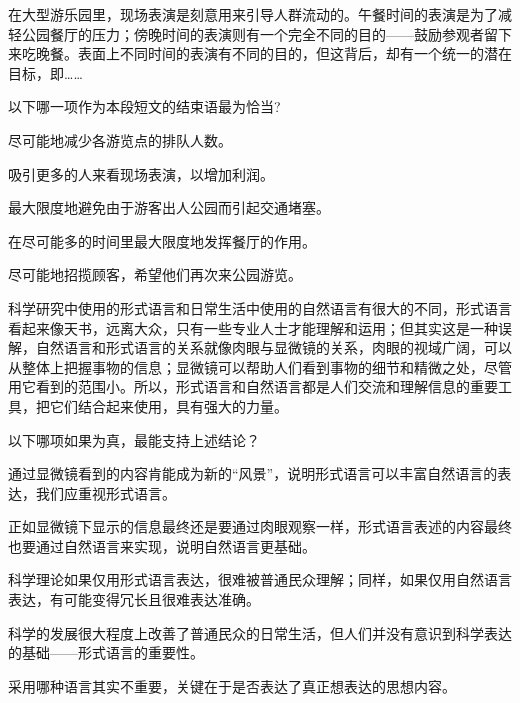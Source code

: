 \documentclass{exam-zh}
\begin{document}
\begin{question}
在大型游乐园里，现场表演是刻意用来引导人群流动的。午餐时间的表演是为了减轻公园餐厅的压力；傍晚时间的表演则有一个完全不同的目的——鼓励参观者留下来吃晚餐。表面上不同时间的表演有不同的目的，但这背后，却有一个统一的潜在目标，即……

以下哪一项作为本段短文的结束语最为恰当?  \paren[]
\begin{choices}
  \item 尽可能地减少各游览点的排队人数。
  \item 吸引更多的人来看现场表演，以增加利润。
  \item 最大限度地避免由于游客出人公园而引起交通堵塞。
  \item 在尽可能多的时间里最大限度地发挥餐厅的作用。
  \item 尽可能地招揽顾客，希望他们再次来公园游览。
\end{choices}
\end{question}

\begin{question}
科学研究中使用的形式语言和日常生活中使用的自然语言有很大的不同，形式语言看起来像天书，远离大众，只有一些专业人士才能理解和运用；但其实这是一种误解，自然语言和形式语言的关系就像肉眼与显微镜的关系，肉眼的视域广阔，可以从整体上把握事物的信息；显微镜可以帮助人们看到事物的细节和精微之处，尽管用它看到的范围小。所以，形式语言和自然语言都是人们交流和理解信息的重要工具，把它们结合起来使用，具有强大的力量。

以下哪项如果为真，最能支持上述结论？ \paren[]
\begin{choices}
  \item 通过显微镜看到的内容肯能成为新的“风景”，说明形式语言可以丰富自然语言的表达，我们应重视形式语言。
  \item 正如显微镜下显示的信息最终还是要通过肉眼观察一样，形式语言表述的内容最终也要通过自然语言来实现，说明自然语言更基础。
  \item 科学理论如果仅用形式语言表达，很难被普通民众理解；同样，如果仅用自然语言表达，有可能变得冗长且很难表达准确。
  \item 科学的发展很大程度上改善了普通民众的日常生活，但人们并没有意识到科学表达的基础——形式语言的重要性。
  \item 采用哪种语言其实不重要，关键在于是否表达了真正想表达的思想内容。
\end{choices}
\end{question}
\end{document}
